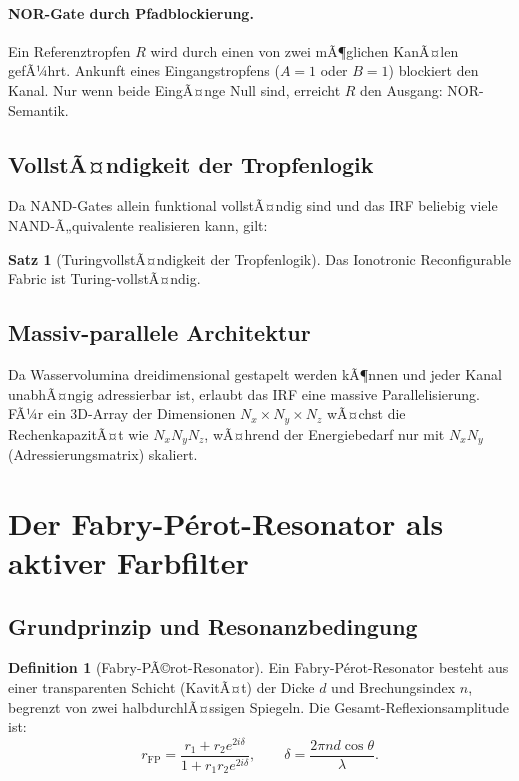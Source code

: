 ﻿\documentclass[a4paper,12pt]{scrreprt}
\theoremstyle{definition}
\newtheorem{definition}{Definition}[section]
\newtheorem{satz}{Satz}[section]
\begin{document}
\paragraph{NOR-Gate durch Pfadblockierung.}
Ein Referenztropfen $R$ wird durch einen von zwei mÃ¶glichen KanÃ¤len gefÃ¼hrt.
Ankunft eines Eingangstropfens ($A = 1$ oder $B = 1$) blockiert den Kanal.
Nur wenn beide EingÃ¤nge Null sind, erreicht $R$ den Ausgang: NOR-Semantik.

\subsection{VollstÃ¤ndigkeit der Tropfenlogik}

Da NAND-Gates allein funktional vollstÃ¤ndig sind und das IRF beliebig viele
NAND-Ã„quivalente realisieren kann, gilt:

\begin{satz}[TuringvollstÃ¤ndigkeit der Tropfenlogik]
  Das Ionotronic Reconfigurable Fabric ist Turing-vollstÃ¤ndig.
\end{satz}

\subsection{Massiv-parallele Architektur}

Da Wasservolumina dreidimensional gestapelt werden kÃ¶nnen und jeder Kanal
unabhÃ¤ngig adressierbar ist, erlaubt das IRF eine massive Parallelisierung.
FÃ¼r ein 3D-Array der Dimensionen $N_x \times N_y \times N_z$ wÃ¤chst die
RechenkapazitÃ¤t wie $N_x N_y N_z$, wÃ¤hrend der Energiebedarf nur mit
$N_x N_y$ (Adressierungsmatrix) skaliert.

\section{Der Fabry-P{\'e}rot-Resonator als aktiver Farbfilter}

\subsection{Grundprinzip und Resonanzbedingung}

\begin{definition}[Fabry-PÃ©rot-Resonator]
  Ein Fabry-P{\'e}rot-Resonator besteht aus einer transparenten Schicht
  (KavitÃ¤t) der Dicke $d$ und Brechungsindex $n$, begrenzt von zwei
  halbdurchlÃ¤ssigen Spiegeln. Die Gesamt-Reflexionsamplitude ist:
  \begin{equation}
    r_\mathrm{FP} = \frac{r_1 + r_2 e^{2i\delta}}{1 + r_1 r_2 e^{2i\delta}},
    \qquad \delta = \frac{2\pi n d \cos\theta}{\lambda}.
    \label{eq:fp-reflexion}
  \end{equation}
\end{definition}
\end{document}
